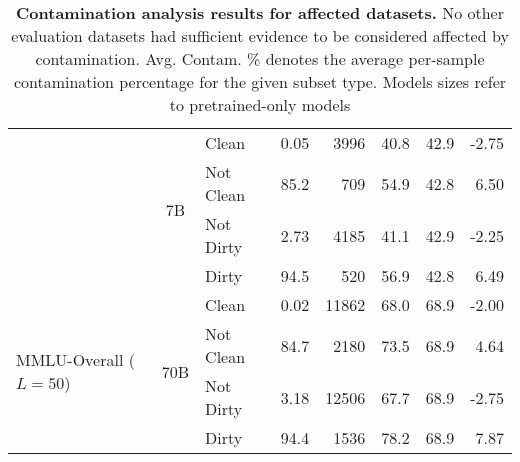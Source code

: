 \begin{table}[]
\begin{tabular}{lclcrrrr}
                                & \multirow{4}{*}{7B}  & Clean      &     0.05   & 3996  & 40.8      & 42.9    & -2.75 \\ %
                                &                      & Not Clean  &    85.2    &  709  & 54.9      & 42.8    &  6.50 \\ %
                                &                      & Not Dirty  &     2.73   & 4185  & 41.1      & 42.9    & -2.25 \\ %
                                &                      & Dirty      &    94.5    &  520  & 56.9      & 42.8    &  6.49 \\
                                \midrule
\multirow{4}{*}{MMLU-Overall ($L=50$)} & \multirow{4}{*}{70B}                                 
                                                        & Clean      &  0.02     & 11862 & 68.0      & 68.9    & -2.00 \\ %
                                &                      & Not Clean   & 84.7      &  2180 & 73.5      & 68.9    &  4.64 \\ %
                                &                      & Not Dirty   &  3.18     & 12506 & 67.7      & 68.9    & -2.75 \\ %
                                &                      & Dirty       & 94.4      &  1536 & 78.2      & 68.9    &  7.87\\ 
                                \bottomrule
                               
\end{tabular}
\caption{\textbf{Contamination analysis results for affected datasets.} No other evaluation datasets had sufficient evidence to be considered affected by contamination. Avg. Contam. \% denotes the average per-sample contamination percentage for the given subset type. Models sizes refer to pretrained-only models}
\label{tab:contamination}
\end{table}

